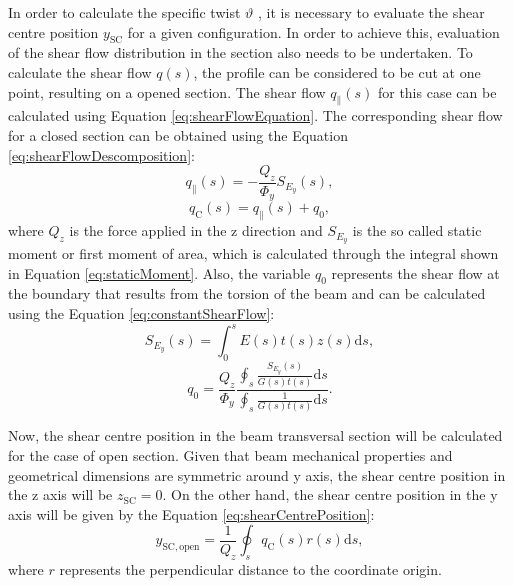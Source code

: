   In order to calculate the specific twist $\vartheta$ , it is necessary to evaluate the shear centre position $y_{\mathrm{SC}}$ for a given configuration. In order to achieve this, evaluation of the shear flow distribution in the section also needs to be undertaken. To calculate the shear flow $q(s)$, the profile can be considered to be cut at one point, resulting on a opened section. The shear flow $q_{\parallel}(s)$ for this case can be calculated using Equation \ref{eq:shearFlowEquation}. The corresponding shear flow for a closed section can be obtained using the Equation \ref{eq:shearFlowDescomposition}:
  \begin{equation}\label{eq:shearFlowEquation}
    q_{\parallel}(s) = - \frac{Q_z}{\Phi_y} S_{E_y}(s),
  \end{equation}
  \begin{equation}\label{eq:shearFlowDescomposition}
    q_\mathrm{C}(s) = q_\parallel(s) + q_0,
  \end{equation}
  where $Q_z$ is the force applied in the z direction and $S_{E_y}$ is the so called static moment or first moment of area, which is calculated through the integral shown in Equation \ref{eq:staticMoment}. Also, the variable $q_0$ represents the shear flow at the boundary that results from the torsion of the beam and can be calculated using the Equation \ref{eq:constantShearFlow}:
  \begin{equation}\label{eq:staticMoment}
    S_{E_y}(s) = \int_0^s E(s) t(s) z(s) \mathrm{d}s,
  \end{equation}
  \begin{equation}\label{eq:constantShearFlow}
    q_0 = \frac{Q_z}{\Phi_y} \frac{ \oint_s \frac{S_{E_y}(s)}{G(s) t(s)} \mathrm{d}s }{ \oint_s \frac{1}{G(s) t(s)} \mathrm{d}s }.
  \end{equation}

  Now, the shear centre position in the beam transversal section will be calculated for the case of open section. Given that beam mechanical properties and geometrical dimensions are symmetric around y axis, the shear centre position in the z axis will be $z_{\mathrm{SC}} = 0$. On the other hand, the shear centre position in the y axis will be given by the Equation \ref{eq:shearCentrePosition}:
  \begin{equation}\label{eq:shearCentrePosition}
    y_{\mathrm{SC,open}} = \frac{1}{Q_z} \oint_s q_\mathrm{C}(s) r(s) \mathrm{d}s,
  \end{equation}
  where $r$ represents the perpendicular distance to the coordinate origin.

